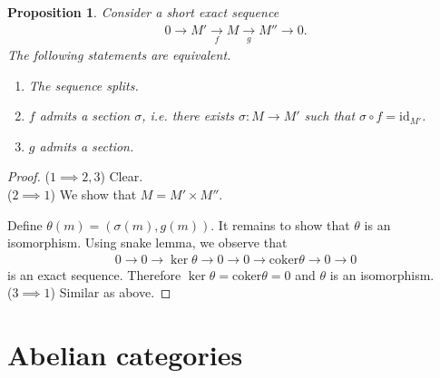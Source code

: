 \documentclass[12pt]{report}
\theoremstyle{plain}
\newtheorem{proposition}[theorem]{Proposition}
\theoremstyle{remark}
\theoremstyle{definition}
\begin{document}
\begin{proposition}
    Consider a short exact sequence
    \begin{align*}
        0\rightarrow M'\xrightarrow[f]{}M\xrightarrow[g]{}M''\rightarrow 0.
    \end{align*}
    The following statements are equivalent.
    \begin{enumerate}
        \item The sequence splits.
        \item $f$ admits a section $\sigma$, i.e. there exists $\sigma:M\rightarrow M'$ such that $\sigma\circ f = \mathrm{id}_{M'}$.
        \item $g$ admits a section.
    \end{enumerate}
\end{proposition}
\begin{proof}
    ($1\implies 2,3$) Clear. \\
    ($2\implies 1$) We show that $M=M'\times M''$.
    \begin{figure}[H]
        \centering
    \end{figure}
    \noindent Define $\theta(m) = (\sigma(m),g(m))$. It remains to show that $\theta$ is an isomorphism. Using snake lemma, we observe that
    \begin{align*}
        0\rightarrow 0\rightarrow \ker\theta \rightarrow 0\rightarrow 0\rightarrow \mathrm{coker}\theta \rightarrow 0\rightarrow 0
    \end{align*}
    is an exact sequence. Therefore $\ker \theta = \mathrm{coker}\theta = 0$ and $\theta$ is an isomorphism. \\
    ($3\implies 1$) Similar as above.
\end{proof}


\clearpage
\section{Abelian categories}
\end{document}
